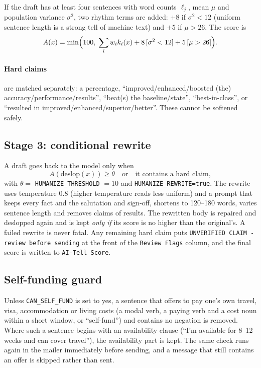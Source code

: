 \documentclass[11pt,a4paper]{article}
\newcommand{\code}[1]{\texttt{#1}}
\begin{document}
\noindent If the draft has at least four sentences with word counts $\ell_j$, mean $\mu$ and
population variance $\sigma^2$, two rhythm terms are added: $+8$ if $\sigma^2 < 12$ (uniform
sentence length is a strong tell of machine text) and $+5$ if $\mu > 26$. The score is
\[
  A(x) = \min\Bigl(100,\; \sum_i w_i k_i(x) + 8\,[\sigma^2 < 12] + 5\,[\mu > 26]\Bigr).
\]

\paragraph{Hard claims} are matched separately: a percentage, ``improved/enhanced/boosted
(the) accuracy/performance/results'', ``beat(s) the baseline/state'', ``best-in-class'', or
``resulted in improved/enhanced/superior/better''. These cannot be softened safely.

\subsection{Stage 3: conditional rewrite}
A draft goes back to the model only when
\[
  A(\text{deslop}(x)) \ge \theta \quad\text{or}\quad \text{it contains a hard claim},
\]
with $\theta =$ \code{HUMANIZE\_THRESHOLD} $= 10$ and \code{HUMANIZE\_REWRITE=true}. The rewrite
uses temperature 0.8 (higher temperature reads less uniform) and a prompt that keeps every fact
and the salutation and sign-off, shortens to 120--180 words, varies sentence length and removes
claims of results. The rewritten body is repaired and deslopped again and is kept \emph{only if}
its score is no higher than the original's. A failed rewrite is never fatal. Any remaining hard
claim puts \code{UNVERIFIED CLAIM - review before sending} at the front of the \code{Review
Flags} column, and the final score is written to \code{AI-Tell Score}.

\subsection{Self-funding guard}
Unless \code{CAN\_SELF\_FUND} is set to yes, a sentence that offers to pay one's own travel, visa,
accommodation or living costs (a modal verb, a paying verb and a cost noun within a short
window, or ``self-fund'') and contains no negation is removed. Where such a sentence begins
with an availability clause (``I'm available for 8--12 weeks and can cover travel''), the
availability part is kept. The same check runs again in the mailer immediately before sending,
and a message that still contains an offer is skipped rather than sent.
\end{document}
